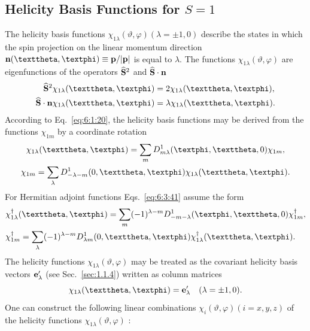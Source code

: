 \subsection{Helicity Basis Functions for $S=1$}\label{sec:6.3.6}
The helicity basis functions $\chi_{1 \lambda}(\vartheta, \varphi)(\lambda= \pm 1,0)$ describe the states in which the spin projection on the linear momentum direction $\vect{n}(\vartheta, \varphi) \equiv \vect{p} /|\vect{p}|$ is equal to $\lambda$. The functions $\chi_{1 \lambda}(\vartheta, \varphi)$ are eigenfunctions of the operators $\widehat{\mathbf{S}}^{2}$ and $\widehat{\mathbf{S}} \cdot \mathbf{n}$
\begin{align}
\widehat{\vect{S}}^{2} \chi_{1 \lambda}(\vartheta, \varphi) & =2 \chi_{1 \lambda}(\vartheta, \varphi), \notag\\
\widehat{\vect{S}} \cdot \vect{n} \chi_{1 \lambda}(\vartheta, \varphi) & =\lambda \chi_{1 \lambda}(\vartheta, \varphi) . \label{eq:6:3:40}
\end{align}
According to Eq.~\eqref{eq:6:1:20}, the helicity basis functions may be derived from the functions $\chi_{1 m}$ by a coordinate rotation
\begin{gather}
\chi_{1 \lambda}(\vartheta, \varphi)=\sum_{m} D_{m \lambda}^{1}(\varphi, \vartheta, 0) \chi_{1 m}, \notag\\
\chi_{1 m}=\sum_{\lambda} D_{-\lambda-m}^{1}(0, \vartheta, \varphi) \chi_{1 \lambda}(\vartheta, \varphi) . \label{eq:6:3:41}
\end{gather}
For Hermitian adjoint functions Eqs.~\eqref{eq:6:3:41} assume the form
\begin{align}
& \chi_{1 \lambda}^{\dagger}(\vartheta, \varphi)=\sum_{m}(-1)^{\lambda-m} D_{-m-\lambda}^{1}(\varphi, \vartheta, 0) \chi_{1 m}^{\dagger}, \notag\\
& \chi_{1 m}^{\dagger}=\sum_{\lambda}(-1)^{\lambda-m} D_{\lambda m}^{1}(0, \vartheta, \varphi) \chi_{1 \lambda}^{\dagger}(\vartheta, \varphi) . \label{eq:6:3:42}
\end{align}
The helicity functions $\chi_{1 \lambda}(\vartheta, \varphi)$ may be treated as the covariant helicity basis vectors $\mathbf{e}_{\lambda}^{\prime}$ (see Sec.~\ref{sec:1.1.4}) written as column matrices
\begin{equation}
\chi_{1 \lambda}(\vartheta, \varphi)=\vect{e}_{\lambda}^{\prime} \quad(\lambda= \pm 1,0) . \label{eq:6:3:43}
\end{equation}
One can construct the following linear combinations $\chi_{i}(\vartheta, \varphi)(i=x, y, z)$ of the helicity functions $\chi_{1 \lambda}(\vartheta, \varphi)$ :

